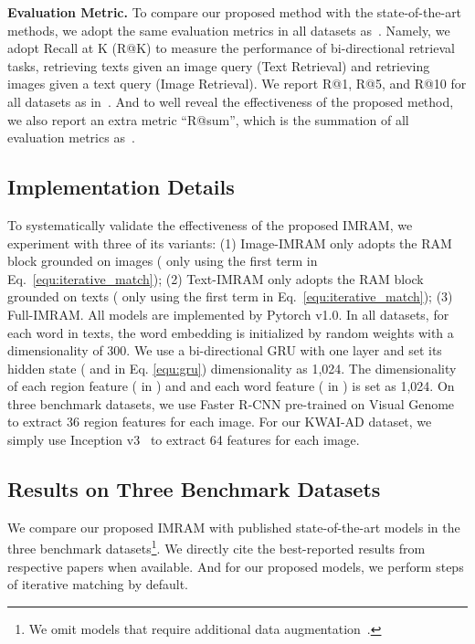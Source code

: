 \documentclass[10pt,twocolumn,letterpaper]{article}
\newcommand{\Ads}{KWAI-AD}
\begin{document}
\textbf{Evaluation Metric.} To compare our proposed method with the state-of-the-art methods, we adopt the same evaluation metrics in all datasets as~\cite{Mithun2018Webly,lee2018stacked,faghri2017vse++}. Namely, we adopt Recall at K (R@K) to measure the performance of bi-directional retrieval tasks, \ie{} retrieving texts given an image query (Text Retrieval) and retrieving images given a text query (Image Retrieval). We report R@1, R@5, and R@10 for all datasets as in~\cite{lee2018stacked}. And to well reveal the effectiveness of the proposed method, we also report an extra metric ``R@sum'', which is the summation of all evaluation metrics as~\cite{huang2017instance}.

\subsection{Implementation Details}
\label{sec:exp_imple}
To systematically validate the effectiveness of the proposed IMRAM, we experiment with three of its variants: (1) Image-IMRAM only adopts the RAM block grounded on images (\ie{} only using the first term in Eq.~\ref{equ:iterative_match}); (2) Text-IMRAM only adopts the RAM block grounded on texts (\ie{} only using the first term in Eq.~\ref{equ:iterative_match}); (3) Full-IMRAM.
All models are implemented by Pytorch v1.0. In all datasets, for each word in texts, the word embedding is initialized by random weights with a dimensionality of 300. We use a bi-directional GRU with one layer and set its hidden state (\ie{}  and  in Eq. \ref{equ:gru}) dimensionality as 1,024. The dimensionality of each region feature (\ie{}  in ) and and each word feature (\ie{}  in ) is set as 1,024. On three benchmark datasets, we use Faster R-CNN pre-trained on Visual Genome to extract 36 region features for each image. For our \Ads{} dataset, we simply use Inception v3~\cite{szegedy2016rethinking} to extract 64 features for each image.


\subsection{Results on Three Benchmark Datasets}
\label{sec:exp_compare}
We compare our proposed IMRAM with published state-of-the-art models in the three benchmark datasets\footnote{We omit models that require additional data augmentation~\cite{Nguyen2019Multi-Task,Shi2019Knowledge,Mithun2018Webly,li2019unicodervl,Chen2019UNITERLU,ji2019saliency}.}. We directly cite the best-reported results from respective papers when available. And for our proposed models, we perform  steps of iterative matching by default.
\end{document}
